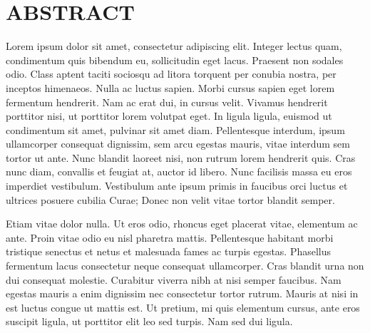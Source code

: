 %
%
%

\chapter*{ABSTRACT}

\pagestyle{plain} %
\setcounter{page}{2}

\indent Lorem ipsum dolor sit amet, consectetur adipiscing elit. Integer lectus quam, condimentum quis bibendum eu, sollicitudin eget lacus. Praesent non sodales odio. Class aptent taciti sociosqu ad litora torquent per conubia nostra, per inceptos himenaeos. Nulla ac luctus sapien. Morbi cursus sapien eget lorem fermentum hendrerit. Nam ac erat dui, in cursus velit. Vivamus hendrerit porttitor nisi, ut porttitor lorem volutpat eget. In ligula ligula, euismod ut condimentum sit amet, pulvinar sit amet diam. Pellentesque interdum, ipsum ullamcorper consequat dignissim, sem arcu egestas mauris, vitae interdum sem tortor ut ante. Nunc blandit laoreet nisi, non rutrum lorem hendrerit quis. Cras nunc diam, convallis et feugiat at, auctor id libero. Nunc facilisis massa eu eros imperdiet vestibulum. Vestibulum ante ipsum primis in faucibus orci luctus et ultrices posuere cubilia Curae; Donec non velit vitae tortor blandit semper.

Etiam vitae dolor nulla. Ut eros odio, rhoncus eget placerat vitae, elementum ac ante. Proin vitae odio eu nisl pharetra mattis. Pellentesque habitant morbi tristique senectus et netus et malesuada fames ac turpis egestas. Phasellus fermentum lacus consectetur neque consequat ullamcorper. Cras blandit urna non dui consequat molestie. Curabitur viverra nibh at nisi semper faucibus. Nam egestas mauris a enim dignissim nec consectetur tortor rutrum. Mauris at nisi in est luctus congue ut mattis est. Ut pretium, mi quis elementum cursus, ante eros suscipit ligula, ut porttitor elit leo sed turpis. Nam sed dui ligula.

 

\pagebreak{}
